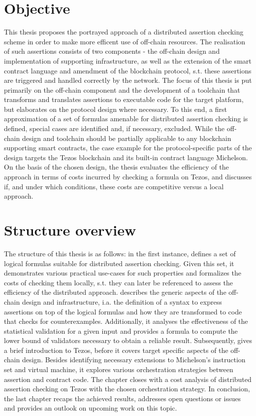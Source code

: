 \section{Objective}
This thesis proposes the portrayed approach of a distributed assertion checking scheme in order to make more efficent use of off-chain resources. The realisation of such assertions consists of two components - the off-chain design and implementation of supporting infrastructure, as well as the extension of the smart contract language and amendment of the blockchain protocol, s.t. these assertions are triggered and handled correctly by the network. The focus of this thesis is put primarily on the off-chain component and the development of a toolchain that transforms and translates assertions to executable code for the target platform, but elaborates on the protocol design where necessary. To this end, a first approximation of a set of formulas amenable for distributed assertion checking is defined, special cases are identified and, if necessary, excluded. While the off-chain design and toolchain should be partially applicable to any blockchain supporting smart contracts, the case example for the protocol-specific parts of the design targets the Tezos blockchain and its built-in contract language Michelson. On the basis of the chosen design, the thesis evaluates the efficiency of the approach in terms of costs incurred by checking a formula on Tezos, and discusses if, and under which conditions, these costs are competitive versus a local approach.

\section{Structure overview}
The structure of this thesis is as follows: in the first instance,  defines a set of logical formulas suitable for distributed assertion checking. Given this set, it demonstrates various practical use-cases for such properties and formalizes the costs of checking them locally, s.t. they can later be referenced to assess the efficiency of the distributed approach.  describes the generic aspects of the off-chain design and infrastructure, i.a. the definition of a syntax to express assertions on top of the logical formulas and how they are transformed to code that checks for counterexamples. Additionally, it analyses the effectiveness of the statistical validation for a given input and provides a formula to compute the lower bound of validators necessary to obtain a reliable result. Subsequently,  gives a brief introduction to Tezos, before it covers target specific aspects of the off-chain design. Besides identifying necessary extensions to Michelson's instruction set and virtual machine, it explores various orchestration strategies between assertion and contract code. The chapter closes with a cost analysis of distributed assertion checking on Tezos with the chosen orchestration strategy. In conclusion, the last chapter recaps the achieved results, 
addresses open questions or issues and provides an outlook on upcoming work on this topic.